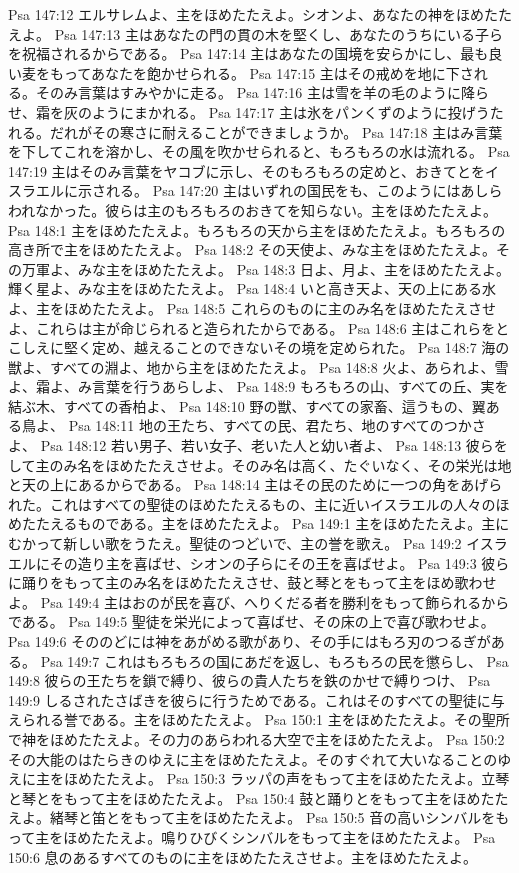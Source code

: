 Psa 147:12  エルサレムよ、主をほめたたえよ。シオンよ、あなたの神をほめたたえよ。
Psa 147:13  主はあなたの門の貫の木を堅くし、あなたのうちにいる子らを祝福されるからである。
Psa 147:14  主はあなたの国境を安らかにし、最も良い麦をもってあなたを飽かせられる。
Psa 147:15  主はその戒めを地に下される。そのみ言葉はすみやかに走る。
Psa 147:16  主は雪を羊の毛のように降らせ、霜を灰のようにまかれる。
Psa 147:17  主は氷をパンくずのように投げうたれる。だれがその寒さに耐えることができましょうか。
Psa 147:18  主はみ言葉を下してこれを溶かし、その風を吹かせられると、もろもろの水は流れる。
Psa 147:19  主はそのみ言葉をヤコブに示し、そのもろもろの定めと、おきてとをイスラエルに示される。
Psa 147:20  主はいずれの国民をも、このようにはあしらわれなかった。彼らは主のもろもろのおきてを知らない。主をほめたたえよ。
Psa 148:1  主をほめたたえよ。もろもろの天から主をほめたたえよ。もろもろの高き所で主をほめたたえよ。
Psa 148:2  その天使よ、みな主をほめたたえよ。その万軍よ、みな主をほめたたえよ。
Psa 148:3  日よ、月よ、主をほめたたえよ。輝く星よ、みな主をほめたたえよ。
Psa 148:4  いと高き天よ、天の上にある水よ、主をほめたたえよ。
Psa 148:5  これらのものに主のみ名をほめたたえさせよ、これらは主が命じられると造られたからである。
Psa 148:6  主はこれらをとこしえに堅く定め、越えることのできないその境を定められた。
Psa 148:7  海の獣よ、すべての淵よ、地から主をほめたたえよ。
Psa 148:8  火よ、あられよ、雪よ、霜よ、み言葉を行うあらしよ、
Psa 148:9  もろもろの山、すべての丘、実を結ぶ木、すべての香柏よ、
Psa 148:10  野の獣、すべての家畜、這うもの、翼ある鳥よ、
Psa 148:11  地の王たち、すべての民、君たち、地のすべてのつかさよ、
Psa 148:12  若い男子、若い女子、老いた人と幼い者よ、
Psa 148:13  彼らをして主のみ名をほめたたえさせよ。そのみ名は高く、たぐいなく、その栄光は地と天の上にあるからである。
Psa 148:14  主はその民のために一つの角をあげられた。これはすべての聖徒のほめたたえるもの、主に近いイスラエルの人々のほめたたえるものである。主をほめたたえよ。
Psa 149:1  主をほめたたえよ。主にむかって新しい歌をうたえ。聖徒のつどいで、主の誉を歌え。
Psa 149:2  イスラエルにその造り主を喜ばせ、シオンの子らにその王を喜ばせよ。
Psa 149:3  彼らに踊りをもって主のみ名をほめたたえさせ、鼓と琴とをもって主をほめ歌わせよ。
Psa 149:4  主はおのが民を喜び、へりくだる者を勝利をもって飾られるからである。
Psa 149:5  聖徒を栄光によって喜ばせ、その床の上で喜び歌わせよ。
Psa 149:6  そののどには神をあがめる歌があり、その手にはもろ刃のつるぎがある。
Psa 149:7  これはもろもろの国にあだを返し、もろもろの民を懲らし、
Psa 149:8  彼らの王たちを鎖で縛り、彼らの貴人たちを鉄のかせで縛りつけ、
Psa 149:9  しるされたさばきを彼らに行うためである。これはそのすべての聖徒に与えられる誉である。主をほめたたえよ。
Psa 150:1  主をほめたたえよ。その聖所で神をほめたたえよ。その力のあらわれる大空で主をほめたたえよ。
Psa 150:2  その大能のはたらきのゆえに主をほめたたえよ。そのすぐれて大いなることのゆえに主をほめたたえよ。
Psa 150:3  ラッパの声をもって主をほめたたえよ。立琴と琴とをもって主をほめたたえよ。
Psa 150:4  鼓と踊りとをもって主をほめたたえよ。緒琴と笛とをもって主をほめたたえよ。
Psa 150:5  音の高いシンバルをもって主をほめたたえよ。鳴りひびくシンバルをもって主をほめたたえよ。
Psa 150:6  息のあるすべてのものに主をほめたたえさせよ。主をほめたたえよ。


